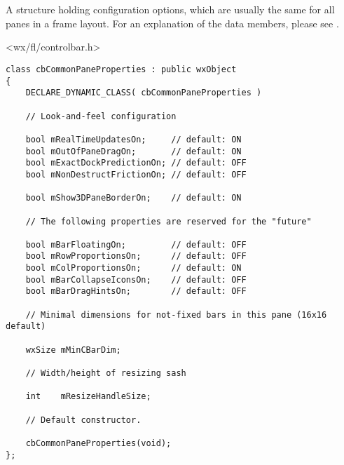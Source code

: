 %
%

\section{}\label{cbcommonpaneproperties}

A structure holding configuration options,
which are usually the same for all panes in
a frame layout. For an explanation of the data members, please
see .




<wx/fl/controlbar.h>


\begin{verbatim}
class cbCommonPaneProperties : public wxObject
{
    DECLARE_DYNAMIC_CLASS( cbCommonPaneProperties )

    // Look-and-feel configuration

    bool mRealTimeUpdatesOn;     // default: ON
    bool mOutOfPaneDragOn;       // default: ON
    bool mExactDockPredictionOn; // default: OFF
    bool mNonDestructFrictionOn; // default: OFF

    bool mShow3DPaneBorderOn;    // default: ON

    // The following properties are reserved for the "future"

    bool mBarFloatingOn;         // default: OFF
    bool mRowProportionsOn;      // default: OFF
    bool mColProportionsOn;      // default: ON
    bool mBarCollapseIconsOn;    // default: OFF
    bool mBarDragHintsOn;        // default: OFF

    // Minimal dimensions for not-fixed bars in this pane (16x16 default)

    wxSize mMinCBarDim;

    // Width/height of resizing sash

    int    mResizeHandleSize;

    // Default constructor.

    cbCommonPaneProperties(void);
};
\end{verbatim}


